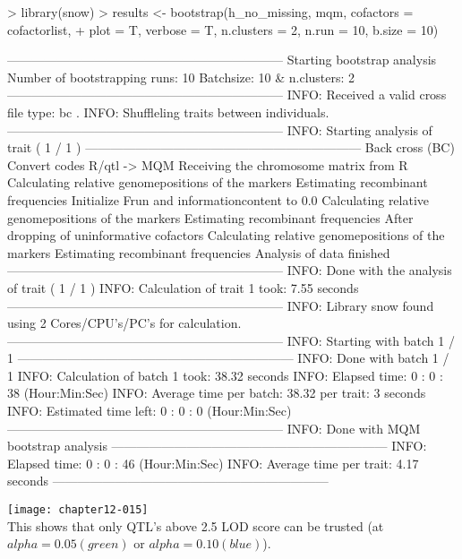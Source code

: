 \documentclass[a4paper]{article}
\begin{document}
\begin{Schunk}
\begin{Sinput}
> library(snow)
> results <- bootstrap(h_no_missing, mqm, cofactors = cofactorlist, 
+     plot = T, verbose = T, n.clusters = 2, n.run = 10, b.size = 10)
\end{Sinput}
\begin{Soutput}
------------------------------------------------------------------
Starting bootstrap analysis
Number of bootstrapping runs: 10 
Batchsize: 10  & n.clusters: 2 
------------------------------------------------------------------
INFO: Received a valid cross file type: bc .
INFO: Shuffleling traits between individuals.
------------------------------------------------------------------
INFO: Starting analysis of trait ( 1 / 1 )
------------------------------------------------------------------
Back cross (BC)
Convert codes R/qtl -> MQM
Receiving the chromosome matrix from R
Calculating relative genomepositions of the markers
Estimating recombinant frequencies
Initialize Frun and informationcontent to 0.0
Calculating relative genomepositions of the markers
Estimating recombinant frequencies
After dropping of uninformative cofactors
Calculating relative genomepositions of the markers
Estimating recombinant frequencies
Analysis of data finished
------------------------------------------------------------------
INFO: Done with the analysis of trait ( 1 / 1 )
INFO: Calculation of trait 1 took: 7.55  seconds
------------------------------------------------------------------
INFO: Library snow found using  2  Cores/CPU's/PC's for calculation.
------------------------------------------------------------------
INFO: Starting with batch 1 / 1 
------------------------------------------------------------------
INFO: Done with batch 1 / 1 
INFO: Calculation of batch 1 took: 38.32 seconds
INFO: Elapsed time: 0 : 0 : 38 (Hour:Min:Sec)
INFO: Average time per batch: 38.32  per trait: 3 seconds
INFO: Estimated time left: 0 : 0 : 0 (Hour:Min:Sec)
------------------------------------------------------------------
INFO: Done with MQM bootstrap analysis
------------------------------------------------------------------
INFO: Elapsed time: 0 : 0 : 46 (Hour:Min:Sec)
INFO: Average time per trait: 4.17 seconds
------------------------------------------------------------------
\end{Soutput}
\end{Schunk}
\texttt{[image: chapter12-015]}
\\
This shows that only QTL's above 2.5 LOD score can be trusted (at $alpha=0.05 (green)$ or $alpha=0.10 (blue)$).
\end{document}
